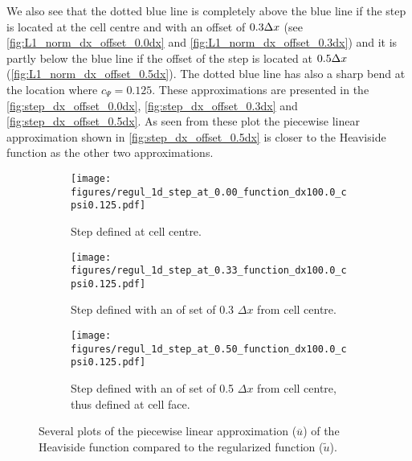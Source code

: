 We also see that the dotted blue line is completely above the blue line if the step is located at the cell centre and with an offset of $0.3\Delta x$ (see \autoref{fig:L1_norm_dx_offset_0.0dx} and \autoref{fig:L1_norm_dx_offset_0.3dx})
and it is partly below the blue line if the offset of the step is located at $0.5\Delta x$ (\autoref{fig:L1_norm_dx_offset_0.5dx}).
The dotted blue line has also a sharp bend at the location where $c_{\Psi}=0.125$. These approximations are presented in the \autoref{fig:step_dx_offset_0.0dx}, \autoref{fig:step_dx_offset_0.3dx} and \autoref{fig:step_dx_offset_0.5dx}.
As seen from these plot the piecewise linear approximation shown in   \autoref{fig:step_dx_offset_0.5dx} is closer to the Heaviside function as the other two approximations.
\begin{figure}[H]
\begin{subfigure}{0.5\textwidth}
    \texttt{[image: figures/regul\_1d\_step\_at\_0.00\_function\_dx100.0\_cpsi0.125.pdf]}
    \caption{Step defined at cell centre.\newline\phantom{text}\label{fig:step_dx_offset_0.0dx}}
\end{subfigure}
\begin{subfigure}{0.5\textwidth}
    \texttt{[image: figures/regul\_1d\_step\_at\_0.33\_function\_dx100.0\_cpsi0.125.pdf]}
    \caption{Step defined with an of set of  0.3 $\Delta x$ from cell centre.\label{fig:step_dx_offset_0.3dx}}
\end{subfigure}
\newline
\begin{subfigure}{0.5\textwidth}
    \texttt{[image: figures/regul\_1d\_step\_at\_0.50\_function\_dx100.0\_cpsi0.125.pdf]}
    \caption{Step defined with an of set of  0.5 $\Delta x$ from cell centre, thus defined at cell face.\label{fig:step_dx_offset_0.5dx}}
\end{subfigure}
\caption{Several plots of the piecewise linear approximation ($\overline{u}$) of the Heaviside function compared to the regularized function ($\widetilde{u}$).}
\end{figure}
